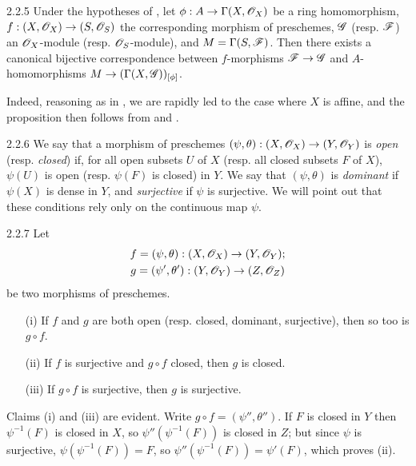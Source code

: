 \documentclass[10pt,oneside]{book}
\begin{document}
\begin{envs}[Proposition]{2.2.5}
\label{prop-1.2.2.5}
Under the hypotheses of , let
$\phi:A\to\Gamma(X,\mathscr{O}_X)$ be a ring homomorphism,
$f:(X,\mathscr{O}_X)\to(S,\mathscr{O}_S)$ the corresponding morphism of preschemes,
$\mathscr{G}$ (resp. $\mathscr{F}$) an $\mathscr{O}_X$-module (resp. $\mathscr{O}_S$-module), and
$M=\Gamma(S,\mathscr{F})$. Then there exists a canonical bijective
correspondence between $f$-morphisms $\mathscr{F}\to\mathscr{G}$  and
$A$-homomorphisms $M\to(\Gamma(X,\mathscr{G}))_{[\phi]}$.
\end{envs}

Indeed, reasoning as in , we are rapidly led to the case where $X$ is
affine, and the proposition then follows from  and .

\begin{env}{2.2.6}
\label{env-1.2.2.6}
We say that a morphism of preschemes
$(\psi,\theta):(X,\mathscr{O}_X)\to(Y,\mathscr{O}_Y)$ is \emph{open} (resp. \emph{closed})
if, for all open subsets $U$ of $X$ (resp. all closed subsets $F$ of $X$),
$\psi(U)$ is open (resp. $\psi(F)$ is closed) in $Y$. We say that
$(\psi,\theta)$ is \emph{dominant} if $\psi(X)$ is dense in $Y$, and
\emph{surjective} if $\psi$ is surjective. We will point out that these
conditions rely only on the continuous map $\psi$.
\end{env}

\begin{envs}[Proposition]{2.2.7}
\label{prop-1.2.2.7}
Let
\begin{gather*}
  f=(\psi,\theta):(X,\mathscr{O}_X)\to(Y,\mathscr{O}_Y);\\
  g=(\psi',\theta'):(Y,\mathscr{O}_Y)\to(Z,\mathscr{O}_Z)
\end{gather*}
be two morphisms of
preschemes.
\begin{itemize}
  \item[(i)] If $f$ and $g$ are both open (resp. closed, dominant, surjective),
             then so too is $g\circ f$.
  \item[(ii)] If $f$ is surjective and $g\circ f$ closed, then $g$ is closed.
  \item[(iii)] If $g\circ f$ is surjective, then $g$ is surjective.
\end{itemize}
\end{envs}
Claims (i) and (iii) are evident. Write $g\circ f=(\psi'',\theta'')$.
If $F$ is closed in $Y$ then $\psi^{-1}(F)$ is closed in $X$, so
$\psi''(\psi^{-1}(F))$ is closed in $Z$; but since $\psi$ is surjective,
$\psi(\psi^{-1}(F))=F$, so $\psi''(\psi^{-1}(F))=\psi'(F)$, which proves (ii).
\end{document}
